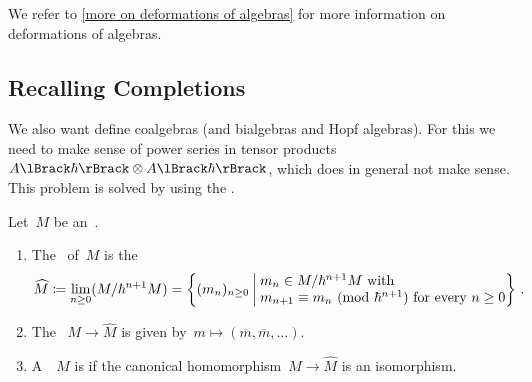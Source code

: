 \documentclass[a4paper, 11pt, oneside]{scrartcl}
\begin{document}
We refer to \cref{more on deformations of algebras} for more information on deformations of algebras.



\subsection{Recalling Completions}

We also want define coalgebras (and bialgebras and Hopf algebras).
For this we need to make sense of power series in tensor products~$\power{A}{\hbar} \tensor \power{A}{\hbar}$, which does in general not make sense.
This problem is solved by using the .

\begin{definition}
  Let~$M$ be an~\module{$\kfhbar$}.
  \begin{enumerate}
    \item
      The~ of~$M$ is the~\module{$\kfhbar$}
      \[
        \widehat{M}
        \defined
        \lim_{n \geq 0} (M / \hbar^{n+1} M)
        =
        \left\{
          (m_n)_{n \geq 0}
        \suchthat*
          \begin{tabular}{@{}l@{}}
            $m_n \in M/ \hbar^{n+1} M$ with \\
            $m_{n+1} \equiv m_n \pMod{\hbar^{n+1}}$ for every~$n \geq 0$
          \end{tabular}
        \right\} \,.
      \]
    \item
      The ~$M \to \widehat{M}$ is given by~$m \mapsto (\overline{m}, \overline{m}, \dotsc)$.
    \item    
      A~\module{$\kfhbar$}~$M$ is  if the canonical homomorphism~$M \to \widehat{M}$ is an isomorphism.
  \end{enumerate}
\end{definition}
\end{document}
